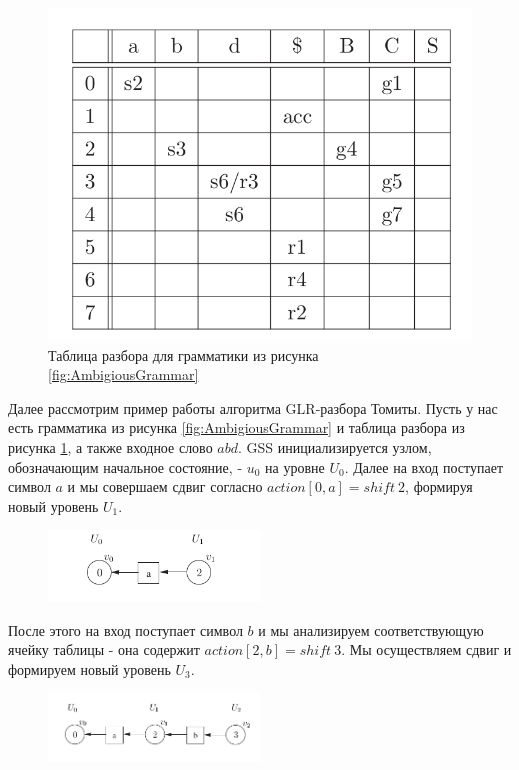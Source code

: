 \begin{figure}%
\centering
\includegraphics[width=\textwidth]{img/glr-parser-table.png}
\caption{Таблица разбора для грамматики из рисунка \ref{fig:AmbigiousGrammar}}
\label{fig:AmbigiousParserTable}
\end{figure}

Далее рассмотрим пример работы алгоритма GLR-разбора Томиты. Пусть у нас есть грамматика из рисунка \ref{fig:AmbigiousGrammar} и таблица разбора из рисунка \ref{fig:AmbigiousParserTable}, а также входное слово $abd$. GSS инициализируется узлом, обозначающим начальное состояние, - $u_0$ на уровне $U_0$. Далее на вход поступает символ $a$ и мы совершаем сдвиг согласно $action[0, a] = shift\ 2$, формируя новый уровень $U_1$.
\begin{figure}[H]
\centering
\includegraphics[width=0.5\textwidth]{img/gss-step1.png}
\end{figure}

После этого на вход поступает символ $b$ и мы анализируем соответствующую ячейку таблицы - она содержит $action[2, b] = shift\ 3$. Мы осуществляем сдвиг и формируем новый уровень $U_3$.
\begin{figure}[H]
\centering
\includegraphics[width=0.5\textwidth]{img/gss-step2.png}
\end{figure}

